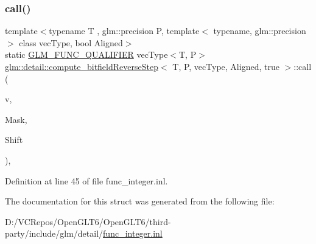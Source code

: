 \subsubsection{\texorpdfstring{call()}{call()}}
{\footnotesize\ttfamily template$<$typename T , glm\+::precision P, template$<$ typename, glm\+::precision $>$ class vec\+Type, bool Aligned$>$ \\
static \mbox{\hyperlink{setup_8hpp_a33fdea6f91c5f834105f7415e2a64407}{G\+L\+M\+\_\+\+F\+U\+N\+C\+\_\+\+Q\+U\+A\+L\+I\+F\+I\+ER}} vec\+Type$<$T, P$>$ \mbox{\hyperlink{structglm_1_1detail_1_1compute__bitfield_reverse_step}{glm\+::detail\+::compute\+\_\+bitfield\+Reverse\+Step}}$<$ T, P, vec\+Type, Aligned, true $>$\+::call (\begin{DoxyParamCaption}\item[{vec\+Type$<$ T, P $>$ const \&}]{v,  }\item[{T}]{Mask,  }\item[{T}]{Shift }\end{DoxyParamCaption})\hspace{0.3cm}{\ttfamily [inline]}, {\ttfamily [static]}}



Definition at line 45 of file func\+\_\+integer.\+inl.



The documentation for this struct was generated from the following file\+:\begin{DoxyCompactItemize}
\item 
D\+:/\+V\+C\+Repos/\+Open\+G\+L\+T6/\+Open\+G\+L\+T6/third-\/party/include/glm/detail/\mbox{\hyperlink{func__integer_8inl}{func\+\_\+integer.\+inl}}\end{DoxyCompactItemize}
